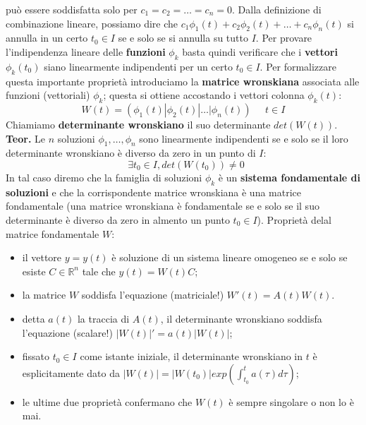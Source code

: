 può essere soddisfatta solo per $c_1 = c_2 = \dots = c_n = 0$.\newline
\newline
Dalla definizione di combinazione lineare, possiamo dire che $ c_1 \phi_1(t) + c_2 \phi_2(t) + \dots + c_n \phi_n (t)$ si annulla in un certo $t_0 \in I$ se e solo se si annulla su tutto $I$.\newline
\newline
Per provare l'indipendenza lineare delle \textbf{funzioni} $\phi_k$ basta quindi verificare che i \textbf{vettori} $\phi_k (t_0)$ siano linearmente indipendenti per un certo $t_0 \in I$. Per formalizzare questa importante proprietà introduciamo la \textbf{matrice wronskiana} associata alle funzioni (vettoriali) $\phi_k$; questa si ottiene accostando i vettori colonna $\phi_k (t)$:
\[
    W(t) = \left( \phi_1(t) | \phi_2(t) | \dots | \phi_n (t) \right) \;\;\;\;\; t \in I
\]
Chiamiamo \textbf{determinante wronskiano} il suo determinante $det(W(t))$.\newline
\textbf{Teor.} Le $n$ soluzioni $\phi_1, \dots, \phi_n$ sono linearmente indipendenti se e solo se il loro determinante wronskiano è diverso da zero in un punto di $I$:
\[
    \;\; \exists t_0 \in I, det(W(t_0)) \neq 0
\]
In tal caso diremo che la famiglia di soluzioni $\phi_k$ è un \textbf{sistema fondamentale di soluzioni} e che la corrispondente matrice wronskiana è una matrice fondamentale (una matrice wronskiana è fondamentale se e solo se il suo determinante è diverso da zero in almento un punto $t_0 \in I$).\newline
\newline
Proprietà delal matrice fondamentale $W$:
\begin{itemize}
    \item il vettore $y = y(t)$ è soluzione di un sistema lineare omogeneo se e solo se esiste $C \in \mathbb{R}^n$ tale che $y(t) = W(t) C$;
    \item la matrice $W$ soddisfa l'equazione (matriciale!) $W'(t) = A(t) W(t)$.
    \item detta $a(t)$ la traccia di $A(t)$, il determinante wronskiano soddisfa l'equazione (scalare!) $|W(t)|' = a(t) |W(t)|$;
    \item fissato $t_0 \in I$ come istante iniziale, il determinante wronskiano in $t$ è esplicitamente dato da $|W(t)| = |W(t_0)| exp(\int_{t_0}^{t} a(\tau) d \tau)$;
    \item le ultime due proprietà confermano che $W(t)$ è sempre singolare o non lo è mai.
\end{itemize} 
